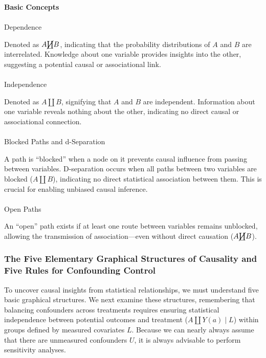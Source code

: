 \documentclass[
  singlecolumn]{article}
\makeatletter
\let\oldparagraph\paragraph
\renewcommand{\paragraph}{
    \@ifstar
      \xxxParagraphStar
      \xxxParagraphNoStar
  }
\newcommand{\xxxParagraphStar}[1]{\oldparagraph*{#1}\mbox{}}
\newcommand{\xxxParagraphNoStar}[1]{\oldparagraph{#1}\mbox{}}
\makeatother
\begin{document}
\textbf{Basic Concepts}

\paragraph{Dependence}\label{dependence}

Denoted as \(A \cancel\coprod B\), indicating that the probability
distributions of \(A\) and \(B\) are interrelated. Knowledge about one
variable provides insights into the other, suggesting a potential causal
or associational link.

\paragraph{Independence}\label{independence}

Denoted as \(A \coprod B\), signifying that \(A\) and \(B\) are
independent. Information about one variable reveals nothing about the
other, indicating no direct causal or associational connection.

\paragraph{Blocked Paths and
d-Separation}\label{blocked-paths-and-d-separation}

A path is ``blocked'' when a node on it prevents causal influence from
passing between variables. D-separation occurs when all paths between
two variables are blocked (\(A \coprod B\)), indicating no direct
statistical association between them. This is crucial for enabling
unbiased causal inference.

\paragraph{Open Paths}\label{open-paths}

An ``open'' path exists if at least one route between variables remains
unblocked, allowing the transmission of association---even without
direct causation (\(A \cancel\coprod B\)).

\subsubsection{The Five Elementary Graphical Structures of Causality and
Five Rules for Confounding Control}\label{sec-five-elementary}

To uncover causal insights from statistical relationships, we must
understand five basic graphical structures. We next examine these
structures, remembering that balancing confounders across treatments
requires ensuring statistical independence between potential outcomes
and treatment (\(A \coprod Y(a) \mid L\)) within groups defined by
measured covariates \(L\). Because we can nearly always assume that
there are unmeasured confounders \(U\), it is always advisable to
perform sensitivity analyses.
\end{document}

